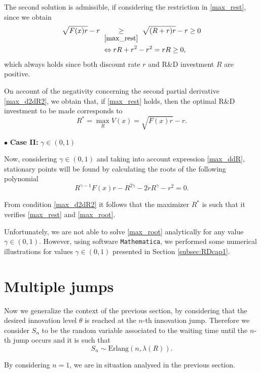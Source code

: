 The second solution is admissible, if considering the restriction in \eqref{max_rest}, since we obtain
\begin{align}
 \sqrt{F(x)r}-r  \ &\underset{\eqref{max_rest}}{\geq} \ \sqrt{(R+r)r}-r \geq 0 \\
 &\Leftrightarrow rR+r^2-r^2=rR\geq 0,
\end{align}
which always holds since both discount rate $r$ and R\&D investment $R$ are positive.

On account of the negativity concerning the second partial derivative \eqref{max_d2dR2}, we obtain that, if \eqref{max_rest} holds, then the optimal R\&D investment to be made corresponds to
\begin{equation}
R^*=\max_R V(x)= \sqrt{F(x)r}-r.
\end{equation}


$\bullet$ \textbf{Case II:} $\gamma \in (0,1) $

Now, considering $\gamma \in (0,1) $ and taking into account expression \eqref{max_ddR}, stationary points will be found by calculating the roots of the following polynomial
\begin{equation}
R^{\gamma-1}F(x)r-R^{2\gamma}-2rR^\gamma-r^2=0.
 \label{max_root}
\end{equation}

From condition \eqref{max_d2dR2} it follows that the maximizer $R^*$ is such that it verifies \eqref{max_rest} and \eqref{max_root}.

Unfortunately, we are not able to solve \eqref{max_root} analytically for any value $\gamma \in (0,1) $. However, using software \texttt{Mathematica}, we performed some numerical illustrations for values $\gamma \in (0,1)$ presented in Section \ref{subsec:RDcap1}.


\section{Multiple jumps}
\label{section:max_jumps}

Now we generalize the context of the previous section, by considering that the desired innovation level $\theta$ is reached at the $n$-th innovation jump.
Therefore we consider $S_n$ to be the random variable associated to the waiting time until the $n$-th jump occurs and it is such that
$$S_n \sim \text{Erlang}(n,\lambda(R)).$$

By considering $n=1$, we are in situation analysed in the previous section.

